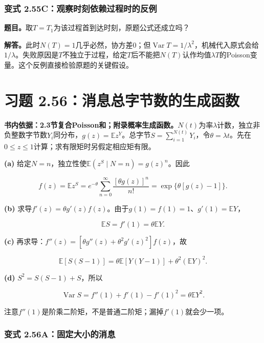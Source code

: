 \documentclass[12pt,a4paper,UTF8,fontset=fandol]{ctexart}
\begin{document}
\subsubsection{变式
2.55C：观察时刻依赖过程时的反例}\label{ux53d8ux5f0f-2.55cux89c2ux5bdfux65f6ux523bux4f9dux8d56ux8fc7ux7a0bux65f6ux7684ux53cdux4f8b}

\textbf{题目。}取\(T=T_1\)为该过程首到达时刻，原题公式还成立吗？

\textbf{解答。}此时\(N(T)=1\)几乎必然，协方差0；但\(\operatorname{Var}T=1/\lambda^2\)，机械代入原式会给\(1/\lambda\)。失败原因是\(T\)不独立于过程，给定\(T\)后不能把\(N(T)\)认作均值\(\lambda T\)的Poisson变量。这个反例直接检验原题的关键假设。

\section{习题
2.56：消息总字节数的生成函数}\label{ux4e60ux9898-2.56ux6d88ux606fux603bux5b57ux8282ux6570ux7684ux751fux6210ux51fdux6570}

\textbf{书内依据：2.3节复合Poisson和；附录概率生成函数。}\(N(t)\)为率\(\lambda\)计数，独立非负整数字节数\(Y_i\)同分布，\(g(z)=\mathbb Ez^Y\)。总字节\(S=\sum_{i=1}^{N(t)}Y_i\)，令\(\theta=\lambda t\)。先在\(0\le z\le1\)计算；求有限矩时另假定相应矩有限。

\textbf{(a)}
给定\(N=n\)，独立性使\(\mathbb E(z^S\mid N=n)=g(z)^n\)。因此

\[\boxed{f(z)=\mathbb Ez^S
=e^{-\theta}\sum_{n=0}^\infty\frac{[\theta g(z)]^n}{n!}
=\exp\{\theta[g(z)-1]\}.}\]

\textbf{(b)}
求导\(f'(z)=\theta g'(z)f(z)\)。由于\(g(1)=f(1)=1\)、\(g'(1)=\mathbb EY\)，

\[\boxed{\mathbb ES=f'(1)=\theta\mathbb EY.}\]

\textbf{(c)} 再求导：\(f''(z)=[\theta g''(z)+\theta^2g'(z)^2]f(z)\)，故

\[\boxed{\mathbb E[S(S-1)]=\theta\mathbb E[Y(Y-1)]+\theta^2(\mathbb EY)^2.}\]

\textbf{(d)} \(S^2=S(S-1)+S\)，所以

\[\boxed{\operatorname{Var}S=f''(1)+f'(1)-f'(1)^2
=\theta\mathbb EY^2.}\]

注意\(f''(1)\)是阶乘二阶矩，不是普通二阶矩；漏掉\(f'(1)\)就会少一项。

\subsubsection{变式
2.56A：固定大小的消息}\label{ux53d8ux5f0f-2.56aux56faux5b9aux5927ux5c0fux7684ux6d88ux606f}
\end{document}
